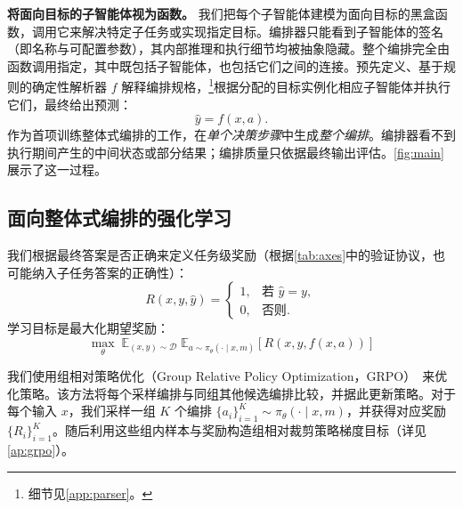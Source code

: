 
\textbf{将面向目标的子智能体视为函数。}
我们把每个子智能体建模为面向目标的黑盒函数，调用它来解决特定子任务或实现指定目标。编排器只能看到子智能体的签名（即名称与可配置参数），其内部推理和执行细节均被抽象隐藏。整个编排完全由函数调用指定，其中既包括子智能体，也包括它们之间的连接。预先定义、基于规则的确定性解析器 $f$ 解释编排规格，\footnote{细节见\cref{app:parser}。}根据分配的目标实例化相应子智能体并执行它们，最终给出预测：
\begin{equation}
\hat{y} = f(x, a).
\end{equation}
作为首项训练整体式编排的工作，\ourframework 在\emph{单个决策步骤}中生成\emph{整个编排}。编排器看不到执行期间产生的中间状态或部分结果；编排质量只依据最终输出评估。\cref{fig:main}展示了这一过程。
\subsection{面向整体式编排的强化学习}

我们根据最终答案是否正确来定义任务级奖励（根据\cref{tab:axes}中的验证协议，也可能纳入子任务答案的正确性）：
\begin{equation}
R(x, y, \hat{y}) =
\begin{cases}
1, & \text{若 } \hat{y} = y, \\
0, & \text{否则}.
\end{cases}
\end{equation}
学习目标是最大化期望奖励：
\begin{equation}
\label{eq:general_objetive}
\max_{\theta} \;
\mathbb{E}_{(x,y) \sim \mathcal{D}} \;
\mathbb{E}_{a \sim \pi_\theta(\cdot \mid x, m)}
\left[ R(x, y, f(x,a)) \right]
\end{equation}

我们使用组相对策略优化（Group Relative Policy Optimization，GRPO）~\citep{shao2024deepseekmath}来优化策略。该方法将每个采样编排与同组其他候选编排比较，并据此更新策略。对于每个输入 $x$，我们采样一组 $K$ 个编排 $\{a_i\}_{i=1}^K \sim \pi_\theta(\cdot \mid x, m)$，并获得对应奖励 $\{R_i\}_{i=1}^K$。随后利用这些组内样本与奖励构造组相对裁剪策略梯度目标（详见\cref{ap:grpo}）。
